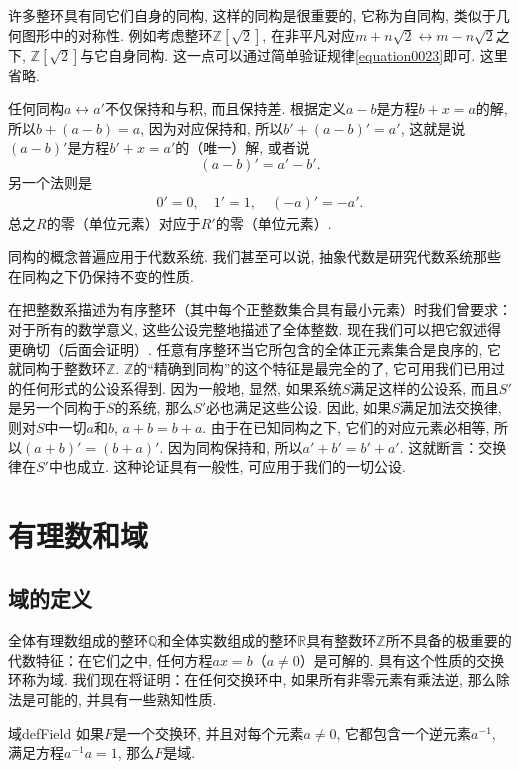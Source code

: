 许多整环具有同它们自身的同构, 这样的同构是很重要的, 它称为自同构, 类似于几何图形中的对称性. 例如考虑整环$\mathbb{Z}[\sqrt{2}]$, 在非平凡对应$m+n\sqrt{2} \leftrightarrow m-n\sqrt{2}$之下, $\mathbb{Z}[\sqrt{2}]$与它自身同构. 这一点可以通过简单验证规律\ref{equation0023}即可. 这里省略. 

任何同构$a \leftrightarrow a'$不仅保持和与积, 而且保持差. 根据定义$a-b$是方程$b+x=a$的解, 所以$b + (a-b) = a$, 因为对应保持和, 所以$b'+(a-b)'=a'$, 这就是说$(a-b)'$是方程$b'+x=a'$的（唯一）解, 或者说
\[
(a-b)' = a'-b'.
\]
另一个法则是
\begin{gather}\label{equation0024}
0'=0,\quad 1'=1, \quad (-a)'=-a'.
\end{gather}
总之$R$的零（单位元素）对应于$R'$的零（单位元素）. 

同构的概念普遍应用于代数系统. 我们甚至可以说, 抽象代数是研究代数系统那些在同构之下仍保持不变的性质. 

在把整数系描述为有序整环（其中每个正整数集合具有最小元素）时我们曾要求：对于所有的数学意义, 这些公设完整地描述了全体整数. 现在我们可以把它叙述得更确切（后面会证明）. 任意有序整环当它所包含的全体正元素集合是良序的, 它就同构于整数环$\mathbb{Z}$. $\mathbb{Z}$的“精确到同构”的这个特征是最完全的了, 它可用我们已用过的任何形式的公设系得到. 因为一般地, 显然, 如果系统$S$满足这样的公设系, 而且$S'$是另一个同构于$S$的系统, 那么$S'$必也满足这些公设. 因此, 如果$S$满足加法交换律, 则对$S$中一切$a$和$b$, $a+b=b+a$. 由于在已知同构之下, 它们的对应元素必相等, 所以$(a+b)'= (b+a)'$. 因为同构保持和, 所以$a'+b'= b'+a'$. 这就断言：交换律在$S'$中也成立. 这种论证具有一般性, 可应用于我们的一切公设. 



\chapter{有理数和域}\label{chapter00102}
\section{域的定义}\label{section0010201}
全体有理数组成的整环$\mathbb{Q}$和全体实数组成的整环$\mathbb{R}$具有整数环$\mathbb{Z}$所不具备的极重要的代数特征：在它们之中, 任何方程$ax=b$（$a \neq 0$）是可解的. 具有这个性质的交换环称为域. 我们现在将证明：在任何交换环中, 如果所有非零元素有乘法逆, 那么除法是可能的, 并具有一些熟知性质. 
\begin{definition}{域}{defField}
如果$F$是一个交换环, 并且对每个元素$a \neq 0$, 它都包含一个逆元素$a^{-1}$, 满足方程$a^{-1}a=1$, 那么$F$是域. 
\end{definition}

